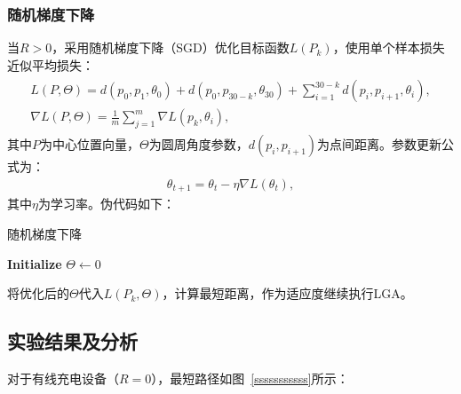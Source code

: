 \documentclass{whutmod}
\begin{document}
            \subsubsection{随机梯度下降}
                当$R > 0$，采用随机梯度下降（SGD）优化目标函数$L(P_k)$，使用单个样本损失近似平均损失：
                \begin{gather}
                    \begin{matrix}
                        L(P, \Theta) = d(p_0, p_1, \theta_0) + d(p_0, p_{30-k}, \theta_{30}) + \sum_{i=1}^{30-k} d(p_i, p_{i+1}, \theta_i), \\
                        \nabla L(P, \Theta) = \frac{1}{m} \sum_{j=1}^{m} \nabla L(p_k, \theta_i),
                    \end{matrix}
                \end{gather}
                其中$P$为中心位置向量，$\Theta$为圆周角度参数，$d(p_i, p_{i+1})$为点间距离。参数更新公式为：
                \begin{gather}
                    \theta_{t+1} = \theta_t - \eta \nabla L(\theta_t),
                \end{gather}
                其中$\eta$为学习率。伪代码如下：

                \begin{algorithm}[H]
                    \caption{随机梯度下降}
                    \LinesNumbered
                    \textbf{Initialize} $\Theta \leftarrow 0$ \\
                    \Return{$\Theta$}
                \end{algorithm}

                将优化后的$\Theta$代入$L(P_k, \Theta)$，计算最短距离，作为适应度继续执行LGA。

        \subsection{实验结果及分析}
            对于有线充电设备（$R=0$），最短路径如图~\ref{sssssssssss}所示：
\end{document}
